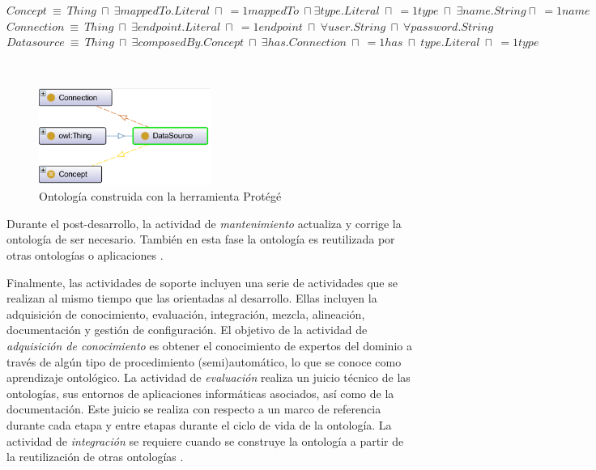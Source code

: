 \begin{minipage}{\textwidth}
$Concept \ \equiv \ Thing \ \sqcap \ \exists  mappedTo.Literal \ \sqcap \ =1 mappedTo \ \sqcap \exists  type.Literal \ \sqcap \ =1 type \ \sqcap \ \exists name.String \sqcap \ =1 name$ \\
$Connection \ \equiv \ Thing \ \sqcap \ \exists endpoint.Literal \ \sqcap \ =1 endpoint \ \sqcap \ \forall user.String \ \sqcap \ \forall password.String $ \\
$Datasource \ \equiv \ Thing \ \sqcap \ \exists composedBy.Concept \ \sqcap \ \exists has.Connection \ \sqcap \ =1 has \ \sqcap \ type.Literal \ \sqcap \ =1 type$ \\
\label{onto:hdrm}
\end{minipage}\\

\begin{figure}
\begin{center}
	\includegraphics[width=0.5\textwidth]{img/ontologiaProtege.png}
\end{center}
\caption{Ontología construida con la herramienta Protégé}
\label{fig: ontologiaProtege}
\end{figure}

Durante el post-desarrollo, la actividad de \textit{mantenimiento} actualiza y corrige la ontología de ser necesario. También en esta fase la ontología es reutilizada por otras ontologías o aplicaciones \citep{Gomez-Perez:2007:OEE:1199560}.

Finalmente, las actividades de soporte incluyen una serie de actividades que se realizan al mismo tiempo que las orientadas al desarrollo. Ellas incluyen la adquisición de conocimiento, evaluación, integración, mezcla, alineación, documentación y gestión de configuración. El objetivo de la actividad de \textit{adquisición de conocimiento} es obtener el conocimiento de expertos del dominio a través de algún tipo de procedimiento (semi)automático, lo que se conoce como aprendizaje ontológico. La actividad de \textit{evaluación} realiza un juicio técnico de las ontologías, sus entornos de aplicaciones informáticas asociados, así como de la documentación. Este juicio se realiza con respecto a un marco de referencia durante cada etapa y entre etapas durante el ciclo de vida de la ontología. La actividad de \textit{integración} se requiere cuando se construye la ontología a partir de la reutilización de otras ontologías \citep{Gomez-Perez:2007:OEE:1199560}.

